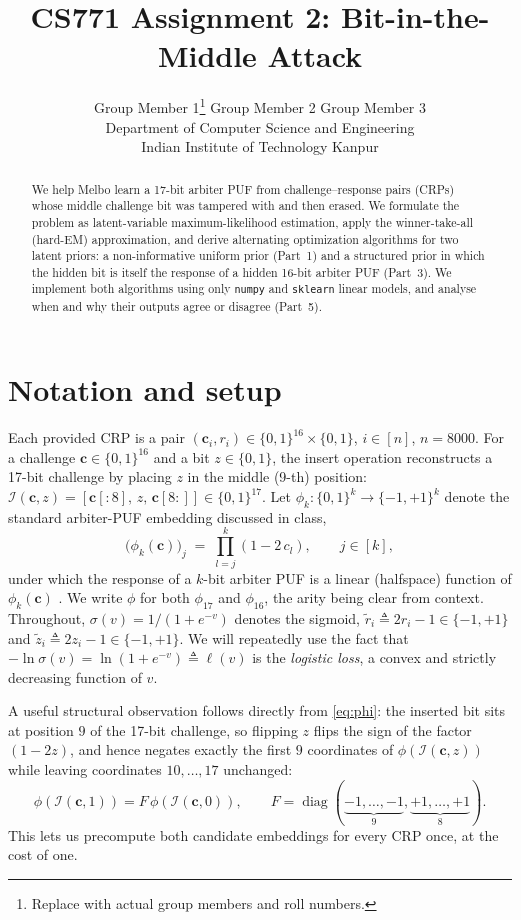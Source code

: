 \documentclass{article}
\title{CS771 Assignment 2: Bit-in-the-Middle Attack}
\author{%
  Group Member 1\thanks{Replace with actual group members and roll numbers.} \quad
  Group Member 2 \quad Group Member 3\\
  Department of Computer Science and Engineering\\
  Indian Institute of Technology Kanpur\\
}
\newcommand{\vc}{\mathbf{c}}
\newcommand{\ins}{\mathcal{I}}
\begin{document}
\maketitle

\begin{abstract}
We help Melbo learn a 17-bit arbiter PUF from challenge--response pairs (CRPs) whose middle
challenge bit was tampered with and then erased. We formulate the problem as latent-variable
maximum-likelihood estimation, apply the winner-take-all (hard-EM) approximation, and derive
alternating optimization algorithms for two latent priors: a non-informative uniform prior
(Part~1) and a structured prior in which the hidden bit is itself the response of a hidden
16-bit arbiter PUF (Part~3). We implement both algorithms using only \texttt{numpy} and
\texttt{sklearn} linear models, and analyse when and why their outputs agree or disagree
(Part~5).
\end{abstract}

\section{Notation and setup}

Each provided CRP is a pair $(\vc_i, r_i) \in \{0,1\}^{16} \times \{0,1\}$, $i \in [n]$,
$n = 8000$. For a challenge $\vc \in \{0,1\}^{16}$ and a bit $z \in \{0,1\}$, the insert
operation reconstructs a 17-bit challenge by placing $z$ in the middle (9-th) position:
$\ins(\vc, z) = [\vc[:8],\, z,\, \vc[8:]] \in \{0,1\}^{17}$.
Let $\phi_k : \{0,1\}^k \to \{-1,+1\}^k$ denote the standard arbiter-PUF embedding discussed
in class,
\begin{equation}
  \label{eq:phi}
  \big(\phi_k(\vc)\big)_j \;=\; \prod_{l = j}^{k} (1 - 2\,c_l), \qquad j \in [k],
\end{equation}
under which the response of a $k$-bit arbiter PUF is a linear (halfspace) function of
$\phi_k(\vc)$ \citep{ruhrmair2010modeling}. We write $\phi$ for both $\phi_{17}$ and
$\phi_{16}$, the arity being clear from context. Throughout, $\sigma(v) = 1/(1+e^{-v})$
denotes the sigmoid, $\tilde r_i \triangleq 2 r_i - 1 \in \{-1,+1\}$ and
$\tilde z_i \triangleq 2 z_i - 1 \in \{-1,+1\}$. We will repeatedly use the fact that
$-\ln \sigma(v) = \ln(1 + e^{-v}) \triangleq \ell(v)$ is the \emph{logistic loss}, a convex
and strictly decreasing function of $v$.

A useful structural observation follows directly from \eqref{eq:phi}: the inserted bit sits
at position $9$ of the 17-bit challenge, so flipping $z$ flips the sign of the factor
$(1 - 2z)$, and hence negates exactly the first $9$ coordinates of $\phi(\ins(\vc, z))$
while leaving coordinates $10,\dots,17$ unchanged:
\begin{equation}
  \label{eq:flip}
  \phi(\ins(\vc, 1)) = F\,\phi(\ins(\vc, 0)), \qquad
  F = \operatorname{diag}(\underbrace{-1,\dots,-1}_{9},\underbrace{+1,\dots,+1}_{8}).
\end{equation}
This lets us precompute both candidate embeddings for every CRP once, at the cost of one.
\end{document}

